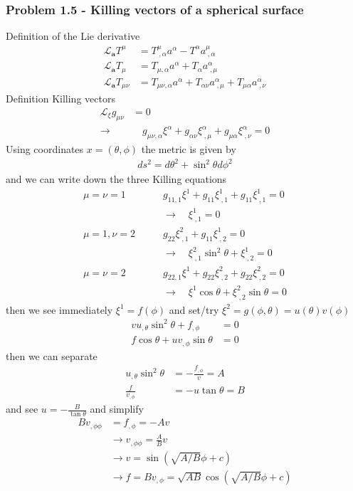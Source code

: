 \documentclass[10pt,a4paper]{book}
\theoremstyle{definition}
\begin{document}
\subsubsection{Problem 1.5 - Killing vectors of a spherical surface}
Definition of the Lie derivative
\begin{align}
\mathcal{L}_\mathbf{a}T^\mu&=T^\mu_{\;,\alpha}a^\alpha-T^\alpha a^\mu_{\;,\alpha}\\
\mathcal{L}_\mathbf{a}T_\mu&=T_{\mu,\alpha}a^\alpha+T_\alpha a^\alpha_{\;,\mu}\\
\mathcal{L}_\mathbf{a}T_{\mu\nu}&=T_{\mu\nu,\alpha}a^\alpha+T_{\alpha\nu} a^\alpha_{\;,\mu}+T_{\mu\alpha} a^\alpha_{\;,\nu}
\end{align}
Definition Killing vectors
\begin{align}
\mathcal{L}_\xi g_{\mu\nu}&=0\\
\rightarrow &\quad g_{\mu\nu,\alpha}\xi^\alpha+g_{\alpha\nu} \xi^\alpha_{\;,\mu}+g_{\mu\alpha} \xi^\alpha_{\;,\nu}=0
\end{align}
Using coordinates $x=(\theta,\phi)$ the metric is given by
\begin{align}
ds^2=d\theta^2+\sin^2\theta d\phi^2
\end{align}
and we can write down the three Killing equations
\begin{align}
\mu=\nu=1\qquad &g_{11,1}\xi^1+g_{11}\xi^1_{\;,1}+g_{11}\xi^1_{\;,1}=0\\
&\rightarrow\quad\xi^1_{\;,1}=0\\
\mu=1, \nu=2\qquad &g_{22}\xi^2_{\;,1}+g_{11}\xi^1_{\;,2}=0\\
&\rightarrow\quad\xi^2_{\;,1}\sin^2\theta+\xi^1_{\;,2}=0\\
\mu=\nu=2\qquad &g_{22,1}\xi^1+g_{22}\xi^2_{\;,2}+g_{22}\xi^2_{\;,2}=0\\
&\rightarrow\quad\xi^1\cos\theta+\xi^2_{\;,2}\sin\theta=0
\end{align}
then we see immediately $\xi^1=f(\phi)$ and set/try $\xi^2=g(\phi,\theta)=u(\theta)v(\phi)$
\begin{align}
vu_{,\theta}\sin^2\theta+f_{,\phi}&=0\\
f\cos\theta+uv_{,\phi}\sin\theta&=0
\end{align}
then we can separate
\begin{align}
u_{,\theta}\sin^2\theta&=-\frac{f_{,\phi}}{v}=A\\
\frac{f}{v_{,\phi}}&=-u\tan\theta=B
\end{align}
and see $u=-\frac{B}{\tan\theta}$ and simplify
\begin{align}
Bv_{,\phi\phi}&=f_{,\phi}=-Av\\
&\rightarrow v_{,\phi\phi}=\frac{A}{B}v\\
&\rightarrow v=\sin(\sqrt{A/B}\phi+c)\\
&\rightarrow f=Bv_{,\phi}=\sqrt{AB}\cos(\sqrt{A/B}\phi+c)
\end{align}
\end{document}
